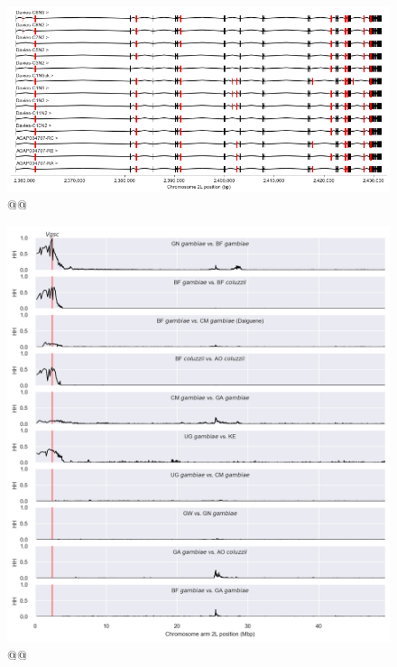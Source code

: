 \documentclass[a4paper,11pt,abstracton,hidelinks]{scrartcl}
\begin{document}
\clearpage
\begin{landscape}

\begin{figure}
\centering
\includegraphics[width=0.8\linewidth,center]{artwork/chapter6/transcripts.png}
\caption{@@
}
\label{fig:transcripts}
\end{figure}

\end{landscape}


\clearpage
\begin{figure}[t!]
\centering
\includegraphics[width=1.1\linewidth,center]{artwork/chapter6/xphh.png}
\caption{@@
}
\label{fig:xphh}
\end{figure}
\end{document}
